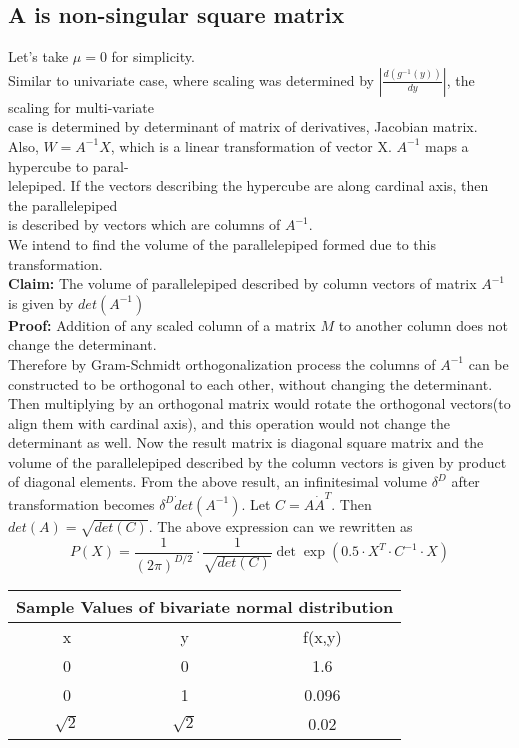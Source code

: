 \documentclass{article}
\begin{document}
\subsection{A is non-singular square matrix}
Let's take $\mu = 0$ for simplicity.
\\Similar to univariate case, where scaling was determined by $|\frac{d(g^{-1}(y))}{dy}|$, the scaling for multi-variate
\\case is determined by determinant of matrix of derivatives, Jacobian matrix.
\\Also, $W = A^{-1}X$, which is a linear transformation of vector X. $A^{-1}$ maps a hypercube to paral-
\\lelepiped. If the vectors describing the hypercube are along cardinal axis, then the parallelepiped
\\is described by vectors which are columns of $A^{-1}$.
\\We intend to find the volume of the parallelepiped formed due to this transformation.
\\\textbf{Claim:} The volume of parallelepiped described by column vectors of matrix $A^{-1}$ is given by $det(A^{-1})$
\\\textbf{Proof:} Addition of any scaled column of a matrix $M$ to another column does not change the
determinant.
\\Therefore by Gram-Schmidt orthogonalization process the columns of $A^{-1}$
can be constructed
to be orthogonal to each other, without changing the determinant. Then multiplying by an orthogonal matrix would rotate the orthogonal vectors(to align them with cardinal axis), and this
operation would not change the determinant as well. Now the result matrix is diagonal square
matrix and the volume of the parallelepiped described by the column vectors is given by product
of diagonal elements.
\newline
From the above result, an infinitesimal volume $\delta^{D}$ after transformation becomes $\delta^{D} \dot det(A^{-1})$.
\newline
Let $C = A \dot A^{T}$. Then $det(A) = \sqrt{det(C)}$. The above expression can we rewritten as
\begin{equation}
    P(X)=\frac{1}{(2\pi)^{D/2}} \cdot \frac{1}{\sqrt{det(C)}} \det \exp(0.5 \cdot X^{T} \cdot C^{-1} \cdot X)
\end{equation}
%
\newline
\begin{tabular}{|c|c||c|}
    \hline
    \multicolumn{3}{|c|}{Sample Values of bivariate normal distribution} \\
    \hline
    x & y & f(x,y) \\
    \hline
    0 & 0 & 1.6 \\
    0 & 1 & 0.096 \\
    $\sqrt{2}$ & $\sqrt{2}$ & 0.02 \\
    \hline
\end{tabular}
\printbibliography
\end{document}
